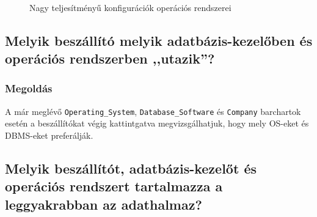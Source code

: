 \documentclass[a4paper,10pt,titlepage]{article}
\begin{document}
\begin{figure}[h!]
  \centering
  ~~~ %
  \caption{Nagy teljesítményű konfigurációk operációs rendszerei}
  \label{fig:tpmc_felso_kategoria_os}
\end{figure}

\subsection{Melyik beszállító melyik adatbázis-kezelőben és operációs rendszerben ,,utazik''?}
\subsubsection*{Megoldás}
A már meglévő \texttt{Operating\_System}, \texttt{Database\_Software} és \texttt{Company} barchartok esetén a beszállítókat végig kattintgatva megvizsgálhatjuk, hogy mely OS-eket és DBMS-eket preferálják.

\subsection{Melyik beszállítót, adatbázis-kezelőt és operációs rendszert tartalmazza a leggyakrabban az adathalmaz?}
\end{document}
